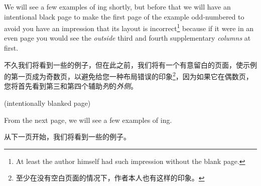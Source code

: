 
 
\ifodd\value{page}
We will see a few examples of \parapag{}ing shortly, but before that we
will have an intentional black page to make the first page of the example
odd-numbered to avoid you have an impression that its layout is
incorrect\footnote{At least the author himself had such impression without the blank page.}
because if it were in an even page you would see the {\em outside\/} third
and fourth supplementary {\em columns\/} at first.

不久我们将看到一些\parapag{}的例子，但在此之前，我们将有一个有意留白的页面，使示例的第一页成为奇数页，以避免给您一种布局错误的印象\footnote{至少在没有空白页面的情况下，作者本人也有这样的印象。}，因为如果它在偶数页，您将首先看到第三和第四个辅助{\em 列}的{\em 外侧}。
\newpage\vspace*{\fill}\centerline{(intentionally blanked page)}\vfill

\else
From the next page, we will see a few examples of \parapag{}ing.

从下一页开始，我们将看到一些\parapag{}的例子。
\fi
  